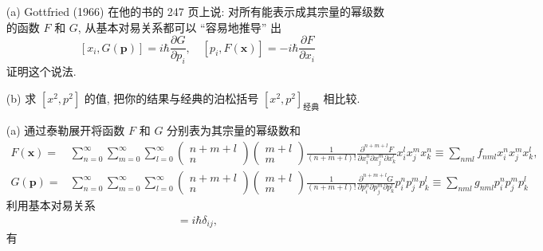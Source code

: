 \documentclass{assignment}
\begin{document}
\begin{prob}[课本习题 1.29]
    \begin{itemize}
        \item[(a)] Gottfried (1966) 在他的书的 247 页上说: 对所有能表示成其宗量的幂级数的函数 $F$ 和 $G$, 从基本对易关系都可以 ``容易地推导'' 出
        \[
            [x_i,G(\bm{p})]=i\hbar\frac{\partial G}{\partial p_i},\quad[p_i,F(\bm{x})]=-i\hbar\frac{\partial F}{\partial x_i}
        \]
        证明这个说法.
        \item[(b)] 求 $[x^2,p^2]$ 的值, 把你的结果与经典的泊松括号 $[x^2,p^2]_{\text{经典}}$ 相比较.
    \end{itemize}
\end{prob}
\begin{sol}
    \begin{itemize}
        \item[(a)] 通过泰勒展开将函数 $F$ 和 $G$ 分别表为其宗量的幂级数和
        \begin{align}
            F(\bm{x})=&\sum_{n=0}^{\infty}\sum_{m=0}^{\infty}\sum_{l=0}^{\infty}\begin{pmatrix}
                n+m+l\\
                n
            \end{pmatrix}\begin{pmatrix}
                m+l\\
                m
            \end{pmatrix}\frac{1}{(n+m+l)!}\frac{\partial^{n+m+l}F}{\partial x_i^n\partial x_j^m\partial x_k^l}x_i^lx_j^mx_k^n\equiv\sum_{nml}f_{nml}x_i^nx_j^mx_k^l,\\
            G(\bm{p})=&\sum_{n=0}^{\infty}\sum_{m=0}^{\infty}\sum_{l=0}^{\infty}\begin{pmatrix}
                n+m+l\\
                n
            \end{pmatrix}\begin{pmatrix}
                m+l\\
                m
            \end{pmatrix}\frac{1}{(n+m+l)!}\frac{\partial^{n+m+l}G}{\partial p_i^n\partial p_j^m\partial p_k^l}p_i^np_j^mp_k^l\equiv\sum_{nml}g_{nml}p_i^np_j^mp_k^l
        \end{align}
        利用基本对易关系
        \begin{align}
            [x_i,p_j]=i\hbar\delta_{ij},
        \end{align}
        有
        \begin{align}

\end{align}
\end{itemize}
\end{sol}
\end{document}
